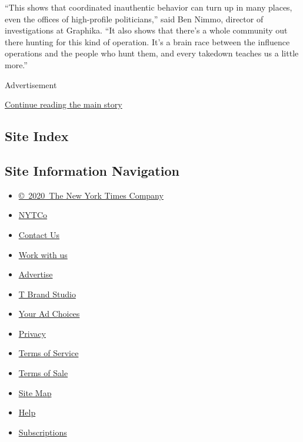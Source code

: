 ``This shows that coordinated inauthentic behavior can turn up in many
places, even the offices of high-profile politicians,'' said Ben Nimmo,
director of investigations at Graphika. ``It also shows that there's a
whole community out there hunting for this kind of operation. It's a
brain race between the influence operations and the people who hunt
them, and every takedown teaches us a little more.''

Advertisement

\protect\hyperlink{after-bottom}{Continue reading the main story}

\hypertarget{site-index}{%
\subsection{Site Index}\label{site-index}}

\hypertarget{site-information-navigation}{%
\subsection{Site Information
Navigation}\label{site-information-navigation}}

\begin{itemize}
\tightlist
\item
  \href{https://help.nytimes.com/hc/en-us/articles/115014792127-Copyright-notice}{©~2020~The
  New York Times Company}
\end{itemize}

\begin{itemize}
\tightlist
\item
  \href{https://www.nytco.com/}{NYTCo}
\item
  \href{https://help.nytimes.com/hc/en-us/articles/115015385887-Contact-Us}{Contact
  Us}
\item
  \href{https://www.nytco.com/careers/}{Work with us}
\item
  \href{https://nytmediakit.com/}{Advertise}
\item
  \href{http://www.tbrandstudio.com/}{T Brand Studio}
\item
  \href{https://www.nytimes.com/privacy/cookie-policy\#how-do-i-manage-trackers}{Your
  Ad Choices}
\item
  \href{https://www.nytimes.com/privacy}{Privacy}
\item
  \href{https://help.nytimes.com/hc/en-us/articles/115014893428-Terms-of-service}{Terms
  of Service}
\item
  \href{https://help.nytimes.com/hc/en-us/articles/115014893968-Terms-of-sale}{Terms
  of Sale}
\item
  \href{https://spiderbites.nytimes.com}{Site Map}
\item
  \href{https://help.nytimes.com/hc/en-us}{Help}
\item
  \href{https://www.nytimes.com/subscription?campaignId=37WXW}{Subscriptions}
\end{itemize}
